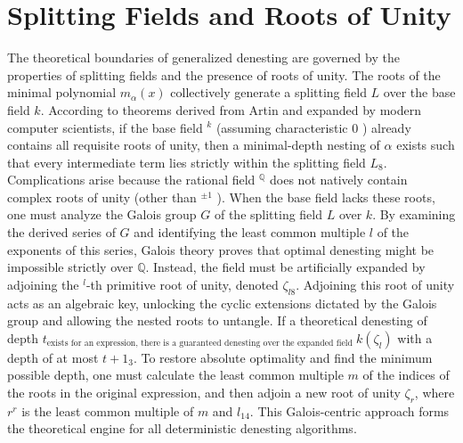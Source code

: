 \documentclass[10pt]{article}
\begin{document}
\section*{Splitting Fields and Roots of Unity}
The theoretical boundaries of generalized denesting are governed by the properties of splitting fields and the presence of roots of unity. The roots of the minimal polynomial $m_{\alpha}(x)$ collectively generate a splitting field $L$ over the base field $k$. According to theorems derived from Artin and expanded by modern computer scientists, if the base field ${ }^{k}$ (assuming characteristic 0 ) already contains all requisite roots of unity, then a minimal-depth nesting of $\alpha$ exists such that every intermediate term lies strictly within the splitting field $L_{8}$. Complications arise because the rational field ${ }^{\mathbb{Q}}$ does not natively contain complex roots of unity (other than ${ }^{ \pm 1}$ ). When the base field lacks these roots, one must analyze the Galois group $G$ of the splitting field $L$ over $k$. By examining the derived series of $G$ and identifying the least common multiple $l$ of the exponents of this series, Galois theory proves that optimal denesting might be impossible strictly over $\mathbb{Q}$. Instead, the field must be artificially expanded by adjoining the ${ }^{l}$-th primitive root of unity, denoted $\zeta_{l 8}$. Adjoining this root of unity acts as an algebraic key, unlocking the cyclic extensions dictated by the Galois group and allowing the nested roots to untangle. If a theoretical denesting of depth $t_{\text {exists for an expression, there is a guaranteed denesting over the expanded field }} k\left(\zeta_{l}\right)$ with a depth of at most $t+1_{3}$. To restore absolute optimality and find the minimum possible depth, one must calculate the least common multiple $m$ of the indices of the roots in the original expression, and then adjoin a new root of unity $\zeta_{r}$, where $r^{r}$ is the least common multiple of $m$ and $l_{14}$. This Galois-centric approach forms the theoretical engine for all deterministic denesting algorithms.
\end{document}
